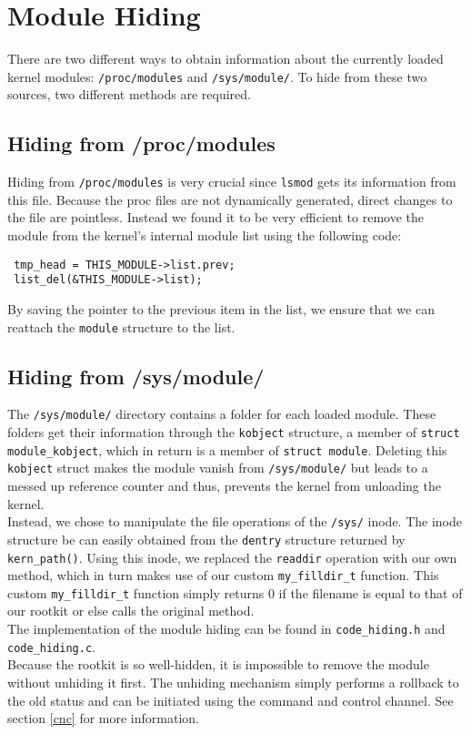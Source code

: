 \section{Module Hiding}
There are two different ways to obtain information about the currently loaded 
kernel modules: \texttt{/proc/modules} and \texttt{/sys/module/}. To hide from 
these two sources, two different methods are required.
\subsection{Hiding from /proc/modules}
Hiding from \texttt{/proc/modules} is very crucial since \texttt{lsmod} gets 
its information from this file. Because the proc files are not dynamically 
generated, direct changes to the file are pointless. Instead we found it to be 
very efficient to remove the module from the kernel's internal module list 
using the following code:
\begin{lstlisting}
 tmp_head = THIS_MODULE->list.prev;
 list_del(&THIS_MODULE->list);	
\end{lstlisting}
By saving the pointer to the previous item in the list, we ensure that we can 
reattach the \texttt{module} structure to the list.

\subsection{Hiding from /sys/module/}
The \texttt{/sys/module/} directory contains a folder for each loaded module. 
These folders get their information through the \texttt{kobject} structure, a 
member of \texttt{struct module\_kobject}, which in return is a member of 
\texttt{struct module}. Deleting this \texttt{kobject} struct makes the module 
vanish from \texttt{/sys/module/} but leads to a messed up reference counter 
and thus, prevents the kernel from unloading the kernel.\\
Instead, we chose to manipulate the file operations of the \texttt{/sys/} 
inode. The inode structure be can easily obtained from the \texttt{dentry} 
structure returned by \texttt{kern\_path()}. Using this inode, we 
replaced the \texttt{readdir} operation with our own method, which in turn 
makes use of 
our custom \texttt{my\_filldir\_t} function. This custom 
\texttt{my\_filldir\_t} function simply returns 0 if 
the filename is equal to that of our rootkit or else calls the original 
method.\newline
\hfill\\
The implementation of the module hiding can be found in \verb+code_hiding.h+ and \verb+code_hiding.c+.
\\Because the rootkit is so well-hidden, it is impossible to remove the module 
without unhiding it first. The unhiding mechanism simply performs a rollback to 
the old status and can be initiated using the command and control channel. 
See section \ref{cnc} for more information.
